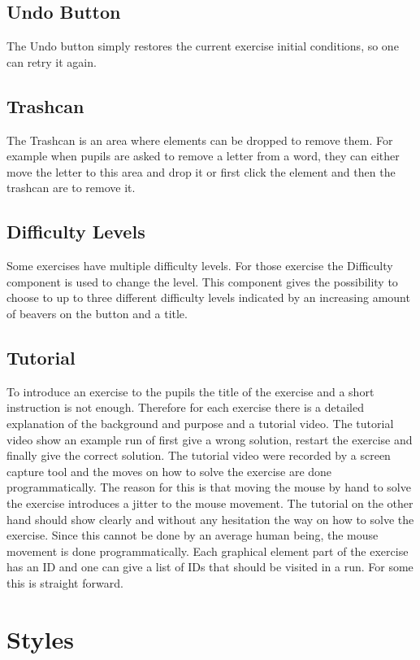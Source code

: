 \subsection*{Undo Button}
The Undo button simply restores the current exercise initial conditions, so one can retry it again.

\subsection*{Trashcan}
The Trashcan is an area where elements can be dropped to remove them. For example when pupils are asked to remove a letter from a word, they can either move the letter to this area and drop it or first click the element and then the trashcan are to remove it.

\subsection*{Difficulty Levels}
Some exercises have multiple difficulty levels. For those exercise the Difficulty component is used to change the level. This component gives the possibility to choose to up to three different difficulty levels indicated by an increasing amount of beavers on the button and a title.

\subsection*{Tutorial}
To introduce an exercise to the pupils the title of the exercise and a short instruction is not enough. Therefore for each exercise there is a detailed explanation of the background and purpose and a tutorial video. The tutorial video show an example run of first give a wrong solution, restart the exercise and finally give the correct solution.
The tutorial video were recorded by a screen capture tool and the moves on how to solve the exercise are done programmatically. The reason for this is that moving the mouse by hand to solve the exercise introduces a jitter to the mouse movement. The tutorial on the other hand should show clearly and without any hesitation the way on how to solve the exercise. Since this cannot be done by an average human being, the mouse movement is done programmatically. Each graphical element part of the exercise has an ID and one can give a list of IDs that should be visited in a run. For some this is straight forward.

\section{Styles}
